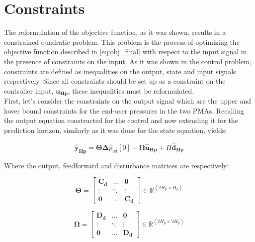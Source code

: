 
\section{Constraints}
\label{constraints_reformulation}

The reformulation of the objective function, as it was shown, results in a constrained quadratic problem. This problem is the process of optimizing the objective function described in \eqref{eq:obj_final} with respect to the input signal in the presence of constraints on the input. As it was shown in the control problem, constraints are defined as inequalities on the output, state and input signals respectively. Since all constraints should be set up as a constraint on the controller input, $\bm{u_{Hp}}$, these inequalities must be reformulated. 
\\
\newline
First, let's consider the constraints on the output signal which are the upper and lower bound constraints for the end-user pressures in the two PMAs. Recalling the output equation constructed for the control and now extending it for the prediction horizon, similarly as it was done for the state equation, yields: 

\begin{equation}
	\bm{\hat{y}_{Hp}} = \bm{\Theta} \bm{\Delta} \hat{p}_{wt}[0] + \bm{\Omega} \bm{\hat{u}_{Hp}} + \Pi \bm{\hat{d}_{Hp}}
\end{equation}

Where the output, feedforward and disturbance matrices are respectively: 

\begin{equation}
  \bm{\Theta} =
 \begin{bmatrix}
 \bm{C_d} & \hdots & \bm{0} \\
 \vdots & \ddots & \vdots\\
 \bm{0} & \hdots & \bm{C_d} 
 \end{bmatrix}
 \in \pmb{\mathbb{R}}^{(2 H_p \times H_p)}
\end{equation}

\begin{equation}
   \bm{\Omega}  =
 \begin{bmatrix}
 \bm{D_d} & \hdots & \bm{0} \\
 \vdots & \ddots & \vdots\\
 \bm{0} & \hdots & \bm{D_d} 
 \end{bmatrix}
 \in \pmb{\mathbb{R}}^{(2 H_p \times 2 H_p)}
 \end{equation}
  
